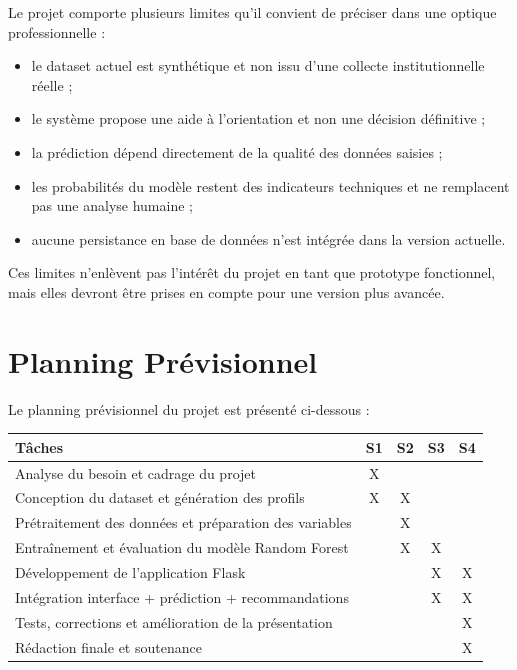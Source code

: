 \documentclass[12pt,a4paper]{report}
\begin{document}
Le projet comporte plusieurs limites qu'il convient de préciser dans une optique professionnelle :
\begin{itemize}[label=--]
    \item le dataset actuel est synthétique et non issu d'une collecte institutionnelle réelle ;
    \item le système propose une aide à l'orientation et non une décision définitive ;
    \item la prédiction dépend directement de la qualité des données saisies ;
    \item les probabilités du modèle restent des indicateurs techniques et ne remplacent pas une analyse humaine ;
    \item aucune persistance en base de données n'est intégrée dans la version actuelle.
\end{itemize}

Ces limites n'enlèvent pas l'intérêt du projet en tant que prototype fonctionnel, mais elles devront être prises en compte pour une version plus avancée.

\chapter{Planning Prévisionnel}

Le planning prévisionnel du projet est présenté ci-dessous :

\begin{center}
\renewcommand{\arraystretch}{1.4}
\begin{tabular}{|p{6.5cm}|c|c|c|c|}
\hline
\textbf{Tâches} & \textbf{S1} & \textbf{S2} & \textbf{S3} & \textbf{S4} \\
\hline
Analyse du besoin et cadrage du projet & X &   &   &   \\
\hline
Conception du dataset et génération des profils & X & X &   &   \\
\hline
Prétraitement des données et préparation des variables &   & X &   &   \\
\hline
Entraînement et évaluation du modèle Random Forest &   & X & X &   \\
\hline
Développement de l'application Flask &   &   & X & X \\
\hline
Intégration interface + prédiction + recommandations &   &   & X & X \\
\hline
Tests, corrections et amélioration de la présentation &   &   &   & X \\
\hline
Rédaction finale et soutenance &   &   &   & X \\
\hline
\end{tabular}
\end{center}
\end{document}
